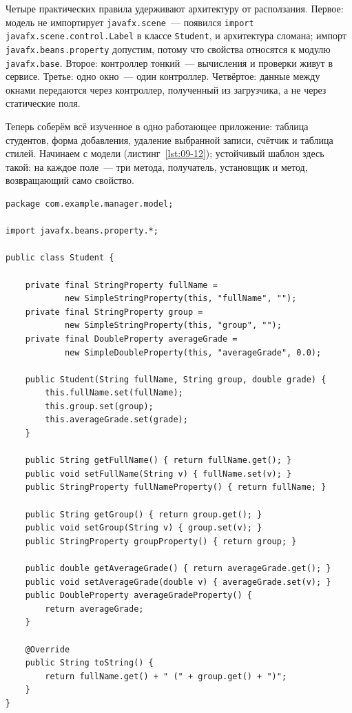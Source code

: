 Четыре практических правила удерживают архитектуру от расползания. Первое:
модель не импортирует \texttt{javafx.scene}~--- появился
\texttt{import javafx.scene.control.Label} в классе \texttt{Student}, и
архитектура сломана; импорт \texttt{javafx.beans.property} допустим, потому что
свойства относятся к модулю \texttt{javafx.base}. Второе: контроллер тонкий~---
вычисления и проверки живут в сервисе. Третье: одно окно~--- один контроллер.
Четвёртое: данные между окнами передаются через контроллер, полученный из
загрузчика, а не через статические поля.

Теперь соберём всё изученное в одно работающее приложение: таблица студентов,
форма добавления, удаление выбранной записи, счётчик и таблица стилей. Начинаем
с модели (листинг~\ref{lst:09-12}); устойчивый шаблон здесь такой: на каждое
поле~--- три метода, получатель, установщик и метод, возвращающий само
свойство.

\begin{listing}[H]
\begin{verbatim}
package com.example.manager.model;

import javafx.beans.property.*;

public class Student {

    private final StringProperty fullName =
            new SimpleStringProperty(this, "fullName", "");
    private final StringProperty group =
            new SimpleStringProperty(this, "group", "");
    private final DoubleProperty averageGrade =
            new SimpleDoubleProperty(this, "averageGrade", 0.0);

    public Student(String fullName, String group, double grade) {
        this.fullName.set(fullName);
        this.group.set(group);
        this.averageGrade.set(grade);
    }

    public String getFullName() { return fullName.get(); }
    public void setFullName(String v) { fullName.set(v); }
    public StringProperty fullNameProperty() { return fullName; }

    public String getGroup() { return group.get(); }
    public void setGroup(String v) { group.set(v); }
    public StringProperty groupProperty() { return group; }

    public double getAverageGrade() { return averageGrade.get(); }
    public void setAverageGrade(double v) { averageGrade.set(v); }
    public DoubleProperty averageGradeProperty() {
        return averageGrade;
    }

    @Override
    public String toString() {
        return fullName.get() + " (" + group.get() + ")";
    }
}
\end{verbatim}
\caption{Модель: класс Student}
\label{lst:09-12}
\end{listing}

